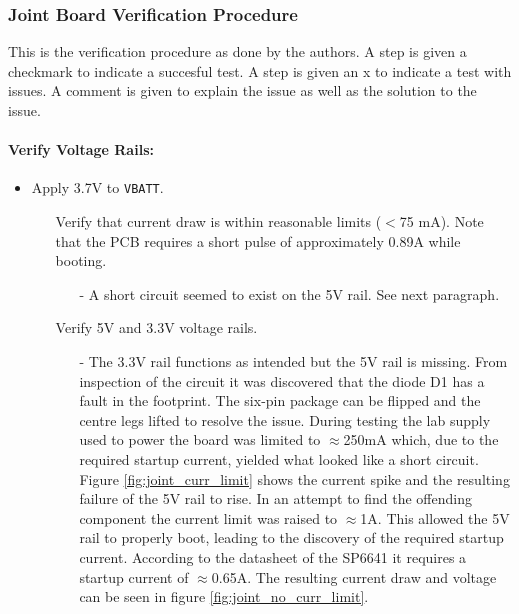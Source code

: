 \subsubsection{Joint Board Verification Procedure} %
\label{ssub:joint_board_verification_methodology}
This is the verification procedure as done by the authors.
A step is given a checkmark to indicate a succesful test.
A step is given an x to indicate a test with issues.
A comment is given to explain the issue as well as the solution to the issue.
\paragraph{Verify Voltage Rails:} %
 \label{par:verify_voltage_rails}
 \begin{itemize}
 	\item Apply 3.7V to \texttt{VBATT}.
 	\begin{itemize}
 		\item[\xmark] Verify that current draw is within reasonable limits ($<$75 mA). Note that the PCB requires a short pulse of approximately 0.89A while booting.
 		\begin{itemize}
 			\item[-] A short circuit seemed to exist on the 5V rail.
 			See next paragraph.
 		\end{itemize}
 		\item[\xmark] Verify 5V and 3.3V voltage rails.
 		\begin{itemize}
 			\item[-] The 3.3V rail functions as intended but the 5V rail is missing.
 			From inspection of the circuit it was discovered that the diode D1 has a fault in the footprint.
 			The six-pin package can be flipped and the centre legs lifted to resolve the issue.
 			During testing the lab supply used to power the board was limited to $\approx$250mA which, due to the required startup current, yielded what looked like a short circuit.
 			Figure \ref{fig:joint_curr_limit} shows the current spike and the resulting failure of the 5V rail to rise.
 			In an attempt to find the offending component the current limit was raised to $\approx$1A.
 			This allowed the 5V rail to properly boot, leading to the discovery of the required startup current.
 			According to the datasheet of the SP6641 \cite{sp6641b} it requires a startup current of $\approx$0.65A. 
 			The resulting current draw and voltage can be seen in figure \ref{fig:joint_no_curr_limit}.
 		\end{itemize}
 	\end{itemize}
 \end{itemize}

